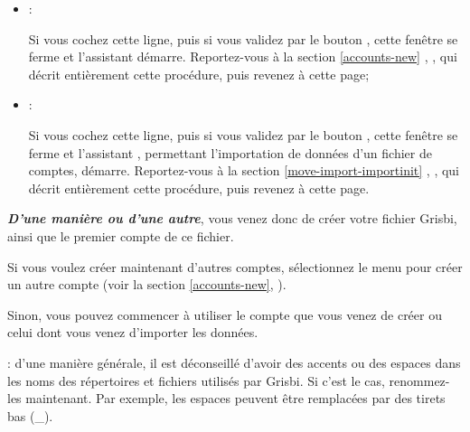 \begin{enumerate}
		\begin{itemize}
			\item[\textopenbullet] :\par
			Si vous cochez cette ligne, puis si vous validez par le bouton , cette fenêtre se ferme et l'assistant  démarre. Reportez-vous à la section \vref{accounts-new}%
			, , qui décrit entièrement cette procédure, puis revenez à cette page;

			\item[\textopenbullet] :\par
			Si vous cochez cette ligne, puis si vous validez par le bouton , cette fenêtre se ferme et l'assistant , permettant l'importation de données d'un fichier de comptes, démarre. Reportez-vous à la section \vref{move-import-importinit}%
			, , qui décrit entièrement cette procédure, puis revenez à cette page.
		\end{itemize}
\end{enumerate}

\label{start-newfile-end}

\textit{\textbf{D'une manière ou d'une autre}}, vous venez donc de créer votre fichier Grisbi, ainsi que le premier compte de ce fichier. 

Si vous voulez créer maintenant d'autres comptes, sélectionnez le menu  pour créer un autre compte (voir la section \vref{accounts-new}, ).

Sinon, vous pouvez commencer à utiliser le compte que vous venez de créer ou celui dont vous venez d'importer les données.\newline

\Attention{}: d'une manière générale, il est déconseillé d'avoir des accents ou des espaces dans les noms des répertoires et fichiers utilisés par Grisbi. Si c'est le cas, renommez-les maintenant. Par exemple, les espaces peuvent être remplacées par des tirets bas (\_).

